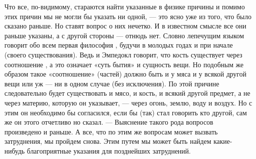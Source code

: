 \documentclass{article}
\begin{document}
Что все, по-видимому, стараются найти указанные в физике причины и помимо этих причин мы не могли бы указать ни одной, — это ясно уже из того, что было сказано раньше. Но ставят вопрос о них нечетко. И в известном смысле все они раньше указаны, а с другой стороны — отнюдь нет. Словно лепечущим языком говорит обо всем первая философия
\footnotemark[1]
, будучи в молодых годах и при начале (своего существования).
\footnotemark[2]
Ведь и Эмпедокл говорит, что кость существует через соотношение
\footnotemark[3]
, а это означает «суть бытия» и сущность вещи. Но подобным же образом такое «соотношение» (частей) должно быть и у мяса и у всякой другой вещи или уж — ни в одном случае (без исключения).
\footnotemark[4]
По этой причине следовательно будет существовать и мясо, и кость, и всякий другой предмет, а не через материю, которую он указывает, — через огонь, землю, воду и воздух. Но с этим он необходимо бы согласился, если бы (так) стал говорить кто другой, сам же он этого отчетливо но сказал. — Выяснение такого рода вопросов произведено и раньше.
\footnotemark[5]
А все, что по этим же вопросам может вызвать затруднения, мы пройдем снова. Этим путем мы может быть найдем какие-нибудь благоприятные указания для позднейших затруднений.
\footnotemark[6]
\end{document}
